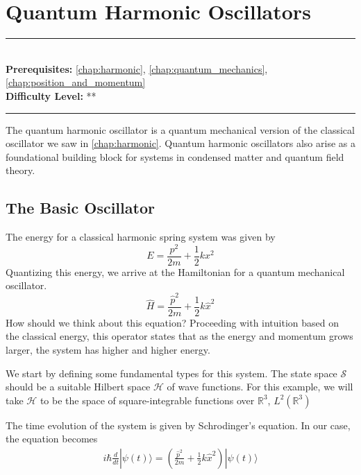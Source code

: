 \documentclass[book.tex]{subfiles}
\begin{document}
\chapter{Quantum Harmonic Oscillators}

\label{chap:quantum_harmonic}
\noindent\rule{11cm}{0.4pt} \\
\textbf{Prerequisites:}
\autoref{chap:harmonic},
\autoref{chap:quantum_mechanics}, \autoref{chap:position_and_momentum} \\
\textbf{Difficulty Level:} ** \\
\noindent\rule{11cm}{0.4pt}
\vspace{5mm}

The quantum harmonic oscillator is a quantum mechanical version of the classical oscillator we saw in \autoref{chap:harmonic}. Quantum harmonic oscillators also arise as a foundational building block for systems in condensed matter and quantum field theory.

\section{The Basic Oscillator}
The energy for a classical harmonic spring system was given by
\begin{equation}
    E = \frac{p^2}{2m} + \frac{1}{2}kx^2
\end{equation}
Quantizing this energy, we arrive at the Hamiltonian for a quantum mechanical oscillator.
\begin{equation}
    \hat{H} = \frac{\hat{p}^2}{2m} + \frac{1}{2}k\hat{x}^2
\end{equation}
How should we think about this equation? Proceeding with intuition based on the classical energy, this operator states that as the energy and momentum grows larger, the system has higher and higher energy.

We start by defining some fundamental types for this system. The state space $\mathcal{S}$ should be a suitable Hilbert space $\mathcal{H}$ of wave functions. For this example, we will take $\mathcal{H}$ to be the space of square-integrable functions over $\mathbb{R}^3$, $L^2(\mathbb{R}^3)$

The time evolution of the system is given by Schrodinger's equation. In our case, the equation becomes
\begin{align}
        i \hbar \frac{d}{dt} | \psi(t) \rangle = \left (\frac{\hat{p}^2}{2m} + \frac{1}{2} k \hat{x}^2 \right ) |\psi(t) \rangle
\end{align}
\end{document}
